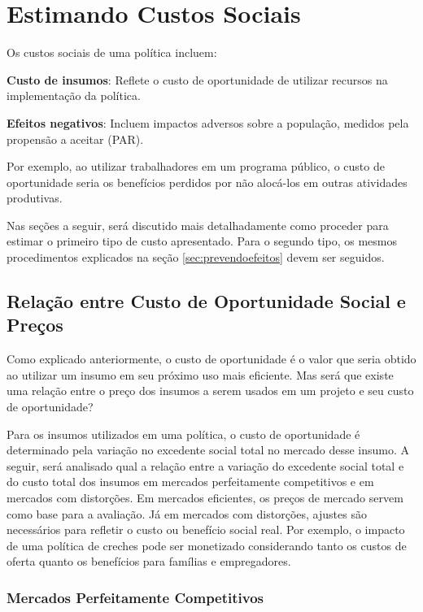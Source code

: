 \documentclass[12pt,letterpaper]{article}
\newcommand{\1}{\mathbbm{1}}
\numberwithin{equation}{section}
\begin{document}
\section{Estimando Custos Sociais}

Os custos sociais de uma política incluem:

\textbf{Custo de insumos}: Reflete o custo de oportunidade de utilizar recursos na implementação da política.

\textbf{Efeitos negativos}: Incluem impactos adversos sobre a população, medidos pela propensão a aceitar (PAR).

Por exemplo, ao utilizar trabalhadores em um programa público, o custo de oportunidade seria os benefícios perdidos por não alocá-los em outras atividades produtivas.

Nas seções a seguir, será discutido mais detalhadamente como proceder para estimar o primeiro tipo de custo apresentado. Para o segundo tipo, os mesmos procedimentos explicados na seção \ref{sec:prevendoefeitos} devem ser seguidos.

\subsection{Relação entre Custo de Oportunidade Social e Preços}

Como explicado anteriormente, o custo de oportunidade é o valor que seria obtido ao utilizar um insumo em seu próximo uso mais eficiente. Mas será que existe uma relação entre o preço dos insumos a serem usados em um projeto e seu custo de oportunidade?

Para os insumos utilizados em uma política, o custo de oportunidade é determinado pela variação no excedente social total no mercado desse insumo. A seguir, será analisado qual a relação entre a variação do excedente social total e do custo total dos insumos em mercados perfeitamente competitivos e em mercados com distorções. Em mercados eficientes, os preços de mercado servem como base para a avaliação. Já em mercados com distorções, ajustes são necessários para refletir o custo ou benefício social real. Por exemplo, o impacto de uma política de creches pode ser monetizado considerando tanto os custos de oferta quanto os benefícios para famílias e empregadores.

\subsubsection{Mercados Perfeitamente Competitivos}
\end{document}

